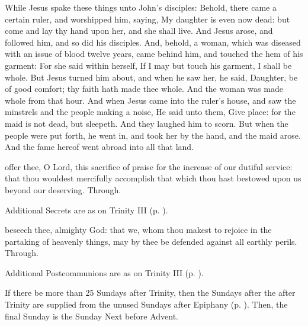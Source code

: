  While Jesus spake these things unto John's disciples: Behold, there came a certain ruler, and worshipped him, saying, My daughter is even now dead: but come and lay thy hand upon her, and she shall live. And Jesus arose, and followed him, and so did his disciples. And, behold, a woman, which was diseased with an issue of blood twelve years, came behind him, and touched the hem of his garment: For she said within herself, If I may but touch his garment, I shall be whole. But Jesus turned him about, and when he saw her, he said, Daughter, be of good comfort; thy faith hath made thee whole. And the woman was made whole from that hour. And when Jesus came into the ruler's house, and saw the minstrels and the people making a noise, He said unto them, Give place: for the maid is not dead, but sleepeth. And they laughed him to scorn. But when the people were put forth, he went in, and took her by the hand, and the maid arose. And the fame hereof went abroad into all that land.


\secret
{} offer thee, O Lord, this sacrifice of praise for the increase of our dutiful service: that thou wouldest mercifully accomplish that which thou hast bestowed upon us beyond our deserving. Through.
\begin{rubric}
    Additional Secrets are as on Trinity III (p. \pageref{TrinityIII}).
\end{rubric}


\postcommunion
{} beseech thee, almighty God: that we, whom thou makest to rejoice in the partaking of heavenly things, may by thee be defended against all earthly perils. Through.
\begin{rubric}
    Additional Postcommunions are as on Trinity III (p. \pageref{TrinityIII}).
\end{rubric}

\begin{rubric}
    If there be more than 25 Sundays after Trinity, then the Sundays after the  after Trinity are supplied from the unused Sundays after Epiphany (p. \pageref{epiphany}). Then, the final Sunday is the Sunday Next before Advent.
\end{rubric}

